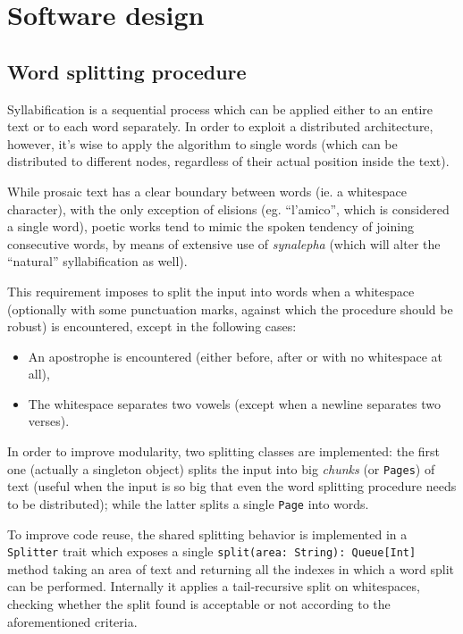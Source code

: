 \chapter{Software design}

\section{Word splitting procedure}
Syllabification is a sequential process which can be applied either to an entire text or to each word separately.
In order to exploit a distributed architecture, however, it's wise to apply the algorithm to single words (which can be distributed to different nodes, regardless of their actual position inside the text).

While prosaic text has a clear boundary between words (ie. a whitespace character), with the only exception of elisions (eg. ``l'amico'', which is considered a single word), poetic works tend to mimic the spoken tendency of joining consecutive words, by means of extensive use of \emph{synalepha} (which will alter the ``natural'' syllabification as well).

This requirement imposes to split the input into words when a whitespace (optionally with some punctuation marks, against which the procedure should be robust) is encountered, except in the following cases:
\begin{itemize}
	\item An apostrophe is encountered (either before, after or with no whitespace at all),
	\item The whitespace separates two vowels (except when a newline separates two verses).
\end{itemize}

In order to improve modularity, two splitting classes are implemented: the first one (actually a singleton object) splits the input into big \emph{chunks} (or \texttt{Pages}) of text (useful when the input is so big that even the word splitting procedure needs to be distributed); while the latter splits a single \texttt{Page} into words.

To improve code reuse, the shared splitting behavior is implemented in a \texttt{Splitter} trait which exposes a single \texttt{split(area: String): Queue[Int]} method taking an area of text and returning all the indexes in which a word split can be performed.
Internally it applies a tail-recursive split on whitespaces, checking whether the split found is acceptable or not according to the aforementioned criteria.

